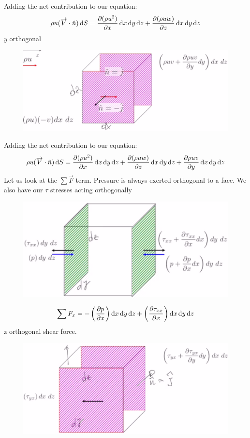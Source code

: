 \documentclass[class=report, crop=false, 12pt,a4paper]{standalone}
\begin{document}
Adding the net contribution to our equation:
\begin{equation}
  \rho u (\overrightarrow{V}\cdot \hat{n}) \dif S = \frac{\partial(\rho u^2)}{\partial x} \dif x \dif y \dif z + \frac{\partial (\rho u w)}{\partial z} \dif x \dif y \dif z
\end{equation}
$y$ orthogonal
\begin{figure}[H]
  \centering
  \includegraphics[width = 0.8 \textwidth]{../img/fluxthroughxz.png}
\end{figure}
Adding the net contribution to our equation:
\begin{equation}
  \rho u (\overrightarrow{V}\cdot \hat{n}) \dif S = \frac{\partial(\rho u^2)}{\partial x} \dif x \dif y \dif z + \frac{\partial (\rho u w)}{\partial z} \dif x \dif y \dif z + \frac{\partial \rho u v}{\partial y} \dif x \dif y \dif z
\end{equation}
Let us look at the $\sum \overrightarrow{F}$ term. Pressure is always exerted orthogonal to a face. We also have our $\tau$ stresses acting orthogonally
\begin{figure}[H]
  \centering
  \includegraphics[width = 0.6 \textwidth]{../img/forcesinx.png}
\end{figure}
\begin{equation}
  \sum F_x = - \left( \frac{\partial p}{\partial x} \right) \dif x \dif y \dif z + \left( \frac{\partial \tau_{xx}}{\partial x} \right) \dif x \dif y \dif z
\end{equation}
z orthogonal shear force.
\begin{figure}[H]
  \centering
  \includegraphics[width = 0.6 \textwidth]{../img/forceinxz.png}
\end{figure}
\end{document}
